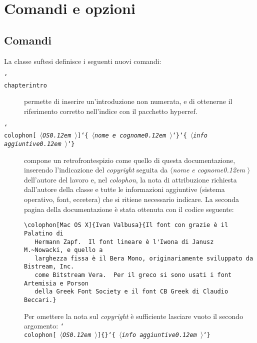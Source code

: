 \documentclass{suftesi}
\DeclareRobustCommand*{\cs}[1]{\texttt{\char`\\#1}}
\DeclareRobustCommand*{\ar}[1]{\texttt{\char`\{#1\char`\}}}
\DeclareRobustCommand*{\oar}[1]{\texttt{[#1]}}
\DeclareRobustCommand*{\meta}[1]{%
  $\langle${\normalfont\itshape#1\kern0.12em }$\rangle$}
\DeclareRobustCommand*{\arm}[1]{\ar{\meta{#1}}}
\DeclareRobustCommand*{\oarm}[1]{\oar{\meta{#1}}}
\newcommand{\pack}{\textsf}
\def\suftesi{\textsf{suftesi}}
\newenvironment{ttquote}
  {\genquote[\ttfamily\microtypesetup{activate=false}]}
  {\endgenquote}
\begin{document}
\chapter{Comandi e opzioni}\label{sec:opzionicomandi}%

\section{Comandi}\label{sec:comandi}

La classe \suftesi{} definisce i seguenti nuovi comandi:
\begin{description}
\item [\cs{chapterintro}] \mbox{}\par
permette di inserire un'introduzione non numerata, e di ottenerne il riferimento corretto nell'indice con il pacchetto \pack{hyperref}.
\item [\cs{colophon\oarm{OS}\arm{nome e cognome}\arm{info aggiuntive}}]\mbox{}\par 
compone un retrofrontespizio come quello di questa documentazione, inserendo l'indicazione del \emph{copyright} seguita da \meta{nome e cognome} dell'autore del lavoro e, nel \emph{colophon}, la nota di attribuzione richiesta dall'autore della classe e tutte le informazioni aggiuntive (sistema operativo, font, eccetera) che si ritiene necessario indicare. 
La seconda pagina della documentazione è stata ottenuta con il codice seguente:

{\footnotesize
\begin{verbatim}
\colophon[Mac OS X]{Ivan Valbusa}{Il font con grazie è il Palatino di 
   Hermann Zapf.  Il font lineare è l'Iwona di Janusz M.~Nowacki, e quello a 
   larghezza fissa è il Bera Mono, originariamente sviluppato da Bistream, Inc.
   come Bitstream Vera.  Per il greco si sono usati i font Artemisia e Porson 
   della Greek Font Society e il font CB Greek di Claudio Beccari.}
\end{verbatim}}

Per omettere la nota sul \emph{copyright} è sufficiente lasciare vuoto il secondo argomento: 
\begin{ttquote}
\cs{colophon\oarm{OS}\{\}\arm{info aggiuntive}}
\end{ttquote}


\end{description}
\end{document}
